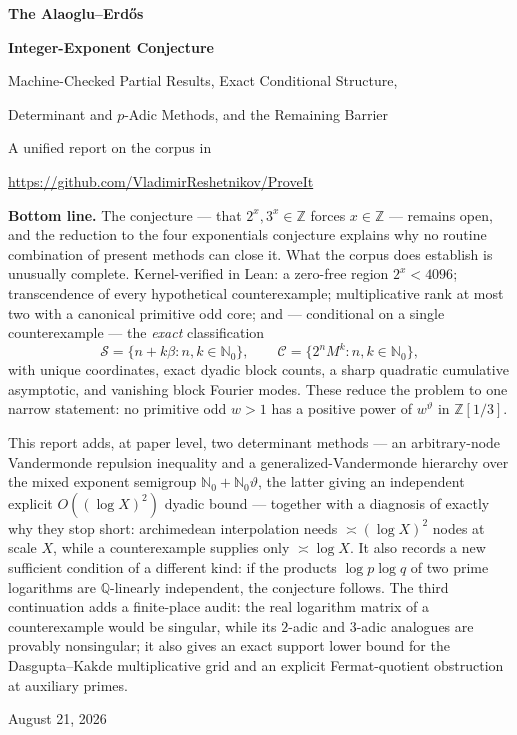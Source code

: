 \documentclass[11pt,oneside]{article}
\theoremstyle{definition}
\theoremstyle{remark}
\newcommand{\Nzero}{\mathbb N_0}
\newcommand{\Z}{\mathbb Z}
\newcommand{\Q}{\mathbb Q}
\newcommand{\thetaq}{\vartheta}
\newcommand{\Sol}{\mathcal S}
\newcommand{\Cand}{\mathcal C}
\newcommand{\Zthree}{\Z[1/3]}
\begin{document}

\begin{titlepage}
\centering
\vspace*{0.75cm}
{\Huge\bfseries The Alaoglu--Erd\H{o}s\par}
\vspace{0.2cm}
{\Huge\bfseries Integer-Exponent Conjecture\par}
\vspace{0.65cm}
{\LARGE Machine-Checked Partial Results, Exact Conditional Structure,\par}
\vspace{0.12cm}
{\LARGE Determinant and $p$-Adic Methods, and the Remaining Barrier\par}
\vspace{1.0cm}
{\large A unified report on the corpus in\par}
\vspace{0.12cm}
{\large \url{https://github.com/VladimirReshetnikov/ProveIt}\par}
\vfill
\begin{minipage}{0.9\textwidth}
\small
\textbf{Bottom line.}
The conjecture --- that $2^x,3^x\in\Z$ forces $x\in\Z$ --- remains open, and the reduction to
the four exponentials conjecture explains why no routine combination of present methods can
close it.  What the corpus does establish is unusually complete.  Kernel-verified in Lean: a
zero-free region $2^x<4096$; transcendence of every hypothetical counterexample; multiplicative
rank at most two with a canonical primitive odd core; and --- conditional on a single
counterexample --- the \emph{exact} classification
\[
  \Sol=\{n+k\beta:n,k\in\Nzero\},
  \qquad
  \Cand=\{2^nM^k:n,k\in\Nzero\},
\]
with unique coordinates, exact dyadic block counts, a sharp quadratic cumulative asymptotic,
and vanishing block Fourier modes.  These reduce the problem to one narrow statement: no
primitive odd $w>1$ has a positive power of $w^{\thetaq}$ in $\Zthree$.

This report adds, at paper level, two determinant methods --- an arbitrary-node Vandermonde
repulsion inequality and a generalized-Vandermonde hierarchy over the mixed exponent semigroup
$\Nzero+\Nzero\thetaq$, the latter giving an independent explicit $O((\log X)^2)$ dyadic
bound --- together with a diagnosis of exactly why they stop short: archimedean interpolation
needs $\asymp(\log X)^2$ nodes at scale $X$, while a counterexample supplies only
$\asymp\log X$.  It also records a new sufficient condition of a different kind: if the
products $\log p\log q$ of two prime logarithms are $\Q$-linearly independent, the conjecture
follows.  The third continuation adds a finite-place audit: the real logarithm matrix of a
counterexample would be singular, while its $2$-adic and $3$-adic analogues are provably
nonsingular; it also gives an exact support lower bound for the Dasgupta--Kakde multiplicative
grid and an explicit Fermat-quotient obstruction at auxiliary primes.
\end{minipage}
\vfill
{\large August 21, 2026\par}
\end{titlepage}
\end{document}
